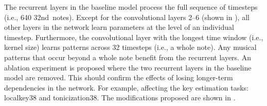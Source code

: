 
The recurrent layers in the baseline model process the full
sequence of timesteps (i.e., 640 \gls{32nd}~notes). Except
for the convolutional layers 2--6 (shown in
), all other layers
in the network learn parameters at the level of an
individual timestep. Furthermore, the convolutional layer
with the longest time window (i.e., kernel size) learns
patterns across 32 timesteps (i.e., a \gls{whole} note). Any
musical patterns that occur beyond a \gls{whole} note
benefit from the recurrent layers. An ablation experiment is
proposed where the two recurrent layers in the baseline
model are removed. This should confirm the effects of losing
longer-term dependencies in the network. For example,
affecting the key estimation tasks: \gls{localkey38} and
\gls{tonicization38}. The modifications proposed are shown
in .

